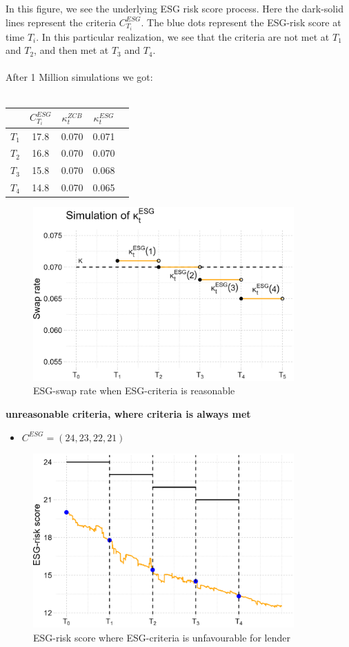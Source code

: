 In this figure, we see the underlying ESG risk score process. Here the dark-solid lines represent the criteria $C_{T_{i}}^{ESG}$. The blue dots represent the ESG-risk score at time $T_{i}$.
In this particular realization, we see that the criteria are not met at $T_{1}$ and $T_{2}$, and then met at $T_{3}$ and $T_{4}$. 
\\~\\ 
After 1 Million simulations we got:
\\~\\
\begin{tabular}{lcccl}
\toprule
           &$C_{T_{i}}^{ESG}$ & $\kappa_{t}^{ZCB}$  & $\kappa_{t}^{ESG}$ \\
\midrule
$T_{1}$ &  17.8 & 0.070 & 0.071 \\
$T_{2}$ &  16.8 & 0.070 & 0.070 \\
$T_{3}$ &  15.8 & 0.070 & 0.068 \\
$T_{4}$ &  14.8 & 0.070 & 0.065 \\
\bottomrule
\end{tabular}

\begin{figure}[htp]
    \centering
    \includegraphics[width= 10cm]{figures/ESG/kappa_t_ESG_1.png}
    \caption{ESG-swap rate when ESG-criteria is reasonable}
    \label{fig: ESG_swap_1}
\end{figure}

\newpage 
\textbf{unreasonable criteria, where criteria is always met}
\begin{itemize}
    \item $C^{ESG} = (24,23,22,21)$
\end{itemize}

\begin{figure}[htp]
    \centering
    \includegraphics[width= 10cm]{figures/ESG/ESG_plt_criteria2.png}
    \caption{ESG-risk score where ESG-criteria is unfavourable for lender}
    \label{fig: ESG_risk_criteria_2}
\end{figure}

